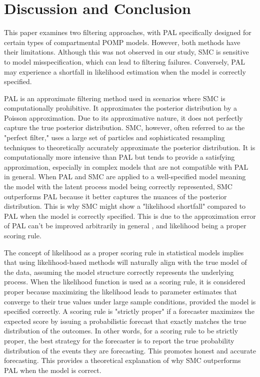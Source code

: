 \documentclass[10pt]{article}
\begin{document}
\section{Discussion and Conclusion}\label{dis}

This paper examines two filtering approaches, with PAL specifically designed for certain types of compartmental POMP models. However, both methods have their limitations. Although this was not observed in our study, SMC is sensitive to model misspecification, which can lead to filtering failures. Conversely, PAL may experience a shortfall in likelihood estimation when the model is correctly specified.

PAL is an approximate filtering method used in scenarios where SMC is computationally prohibitive. It approximates the posterior distribution by a Poisson approximation. Due to its approximative nature, it does not perfectly capture the true posterior distribution. 
SMC, however, often referred to as the "perfect filter," uses a large set of particles and sophisticated resampling techniques to theoretically accurately approximate the posterior distribution. It is computationally more intensive than PAL but tends to provide a satisfying approximation, especially in complex models that are not compatible with PAL in general. When PAL and SMC are applied to a well-specified model meaning the model with the latent process model being correctly represented, SMC outperforms PAL because it better captures the nuances of the posterior distribution. This is why SMC might show a "likelihood shortfall" compared to PAL when the model is correctly specified. This is due to the approximation error of PAL can't be improved arbitrarily in general \citep{annurev:/content/journals/10.1146/annurev-control-042920-015119}, and likelihood being a proper scoring rule.

The concept of likelihood as a proper scoring rule \citep{gneiting1,gneiting2} in statistical models implies that using likelihood-based methods will naturally align with the true model of the data, assuming the model structure correctly represents the underlying process. When the likelihood function is used as a scoring rule, it is considered proper because maximizing the likelihood leads to parameter estimates that converge to their true values under large sample conditions, provided the model is specified correctly. A scoring rule is "strictly proper" if a forecaster maximizes the expected score by issuing a probabilistic forecast that exactly matches the true distribution of the outcomes. In other words, for a scoring rule to be strictly proper, the best strategy for the forecaster is to report the true probability distribution of the events they are forecasting. This promotes honest and accurate forecasting. This provides a theoretical explanation of why SMC outperforms PAL when the model is correct.
\end{document}
